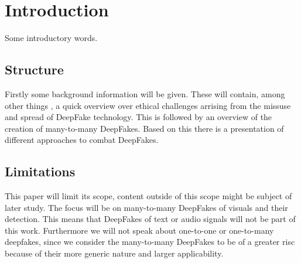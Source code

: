 \section{Introduction}
Some introductory words.

\subsection{Structure}
Firstly some background information will be given. These will contain, among other things
, a quick overview over ethical challenges arrising from the missuse and spread of DeepFake technology.
This is followed by an overview of the creation of many-to-many DeepFakes.
Based on this there is a presentation of different approaches to combat DeepFakes.

\subsection{Limitations}
This paper will limit its scope, content outside of this scope might be subject of later study.
The focus will be on many-to-many DeepFakes of visuals and their detection.
This means that DeepFakes of text or audio signals will not be part of this work.
Furthermore we will not speak about one-to-one or one-to-many deepfakes, since we consider the
many-to-many DeepFakes to be of a greater risc because of their more generic nature and larger applicability.